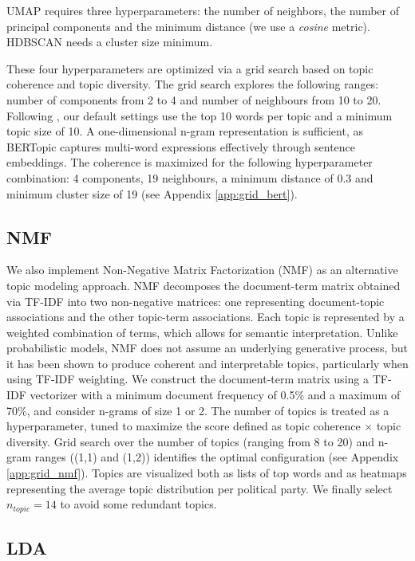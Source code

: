 \documentclass{article}
\begin{document}
UMAP requires three hyperparameters: the number of neighbors, the number of principal components and the minimum distance (we use a \textit{cosine} metric). HDBSCAN needs a cluster size minimum.

These four hyperparameters are optimized via a grid search based on topic coherence and topic diversity. The grid search explores the following ranges: number of components from 2 to 4 and number of neighbours from 10 to 20. Following \citet{orellana2023nlp}, our default settings use the top 10 words per topic and a minimum topic size of 10. A one-dimensional n-gram representation is sufficient, as BERTopic captures multi-word expressions effectively through sentence embeddings. The coherence is maximized for the following hyperparameter combination: 4 components, 19 neighbours, a minimum distance of 0.3 and minimum cluster size of 19 (see Appendix \ref{app:grid_bert}).

\subsection{NMF}

We also implement Non-Negative Matrix Factorization (NMF) as an alternative topic modeling approach. NMF decomposes the document-term matrix obtained via TF-IDF into two non-negative matrices: one representing document-topic associations and the other topic-term associations. Each topic is represented by a weighted combination of terms, which allows for semantic interpretation. Unlike probabilistic models, NMF does not assume an underlying generative process, but it has been shown to produce coherent and interpretable topics, particularly when using TF-IDF weighting. We construct the document-term matrix using a TF-IDF vectorizer with a minimum document frequency of 0.5\% and a maximum of 70\%, and consider n-grams of size 1 or 2. The number of topics is treated as a hyperparameter, tuned to maximize the score defined as topic coherence $\times$ topic diversity. Grid search over the number of topics (ranging from 8 to 20) and n-gram ranges ((1,1) and (1,2)) identifies the optimal configuration (see Appendix \ref{app:grid_nmf}). Topics are visualized both as lists of top words and as heatmaps representing the average topic distribution per political party. We finally select $n_{topic} = 14$ to avoid some redundant topics.

\subsection{LDA}
\end{document}
